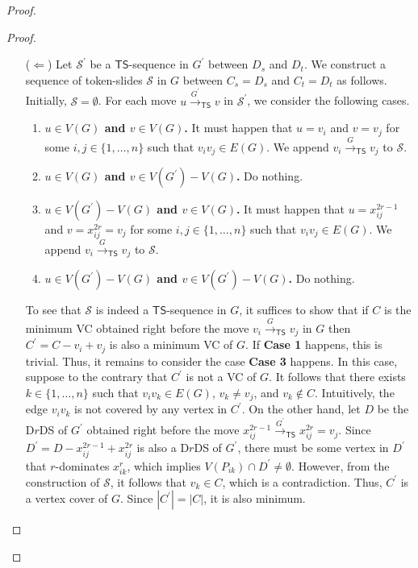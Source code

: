 \documentclass[a4paper]{article}
\theoremstyle{plain}
\theoremstyle{definition}
\newcommand{\sfTS}{{\mathsf{TS}}} %
\newcommand{\sfR}{{\mathsf{R}}} %
\newcommand{\calS}{{\mathcal{S}}}
\newcommand{\reconf}[2][\sfR]{\overset{#2}{\longrightarrow}_{#1}} %
\begin{document}
\begin{proof}
\begin{proof}
\begin{itemize}
			\item[($\Leftarrow$)] Let $\calS^\prime$ be a $\sfTS$-sequence in $G^\prime$ between $D_s$ and $D_t$.
			We construct a sequence of token-slides $\calS$ in $G$ between $C_s = D_s$ and $C_t = D_t$ as follows.
			Initially, $\calS = \emptyset$.
			For each move $u \reconf[\sfTS]{G^\prime} v$ in $\calS^\prime$, we consider the following cases.
			\begin{enumerate}[{\bf {Case} 1:}]
				\item {\bf $u \in V(G)$ and $v \in V(G)$.} It must happen that $u = v_i$ and $v = v_j$ for some $i, j \in \{1, \dots, n\}$ such that $v_iv_j \in E(G)$. We append $v_i \reconf[\sfTS]{G} v_j$ to $\calS$.
				
				\item {\bf $u \in V(G)$ and $v \in V(G^\prime) - V(G)$.} Do nothing.
				
				\item {\bf $u \in V(G^\prime) - V(G)$ and $v \in V(G)$.} It must happen that $u = x_{ij}^{2r-1}$ and $v = x_{ij}^{2r} = v_j$ for some $i, j \in \{1, \dots, n\}$ such that $v_iv_j \in E(G)$.
				We append $v_i \reconf[\sfTS]{G} v_j$ to $\calS$.
				
				\item {\bf $u \in V(G^\prime) - V(G)$ and $v \in V(G^\prime) - V(G)$.} Do nothing.
			\end{enumerate}
			
			To see that $\calS$ is indeed a $\sfTS$-sequence in $G$, it suffices to show that if $C$ is the minimum VC obtained right before the move $v_i \reconf[\sfTS]{G} v_j$ in $G$ then $C^\prime = C - v_i + v_j$ is also a minimum VC of $G$.
			If {\bf Case 1} happens, this is trivial.
			Thus, it remains to consider the case {\bf Case 3} happens.
			In this case, suppose to the contrary that $C^\prime$ is not a VC of $G$.
			It follows that there exists $k \in \{1, \dots, n\}$ such that $v_iv_k \in E(G)$, $v_k \neq v_j$, and $v_k \notin C$.
			Intuitively, the edge $v_iv_k$ is not covered by any vertex in $C^\prime$.
			On the other hand, let $D$ be the D$r$DS of $G^\prime$ obtained right before the move $x_{ij}^{2r-1} \reconf[\sfTS]{G^\prime} x_{ij}^{2r} = v_j$.
			Since $D^\prime = D - x_{ij}^{2r-1} + x_{ij}^{2r}$ is also a D$r$DS of $G^\prime$, there must be some vertex in $D^\prime$ that $r$-dominates $x_{ik}^r$, which implies $V(P_{ik}) \cap D^\prime \neq \emptyset$.
			However, from the construction of $\calS$, it follows that $v_k \in C$, which is a contradiction.
			Thus, $C^\prime$ is a vertex cover of $G$.
			Since $|C^\prime| = |C|$, it is also minimum.
		\end{itemize}
	\end{proof}
	

\end{proof}
\end{document}
